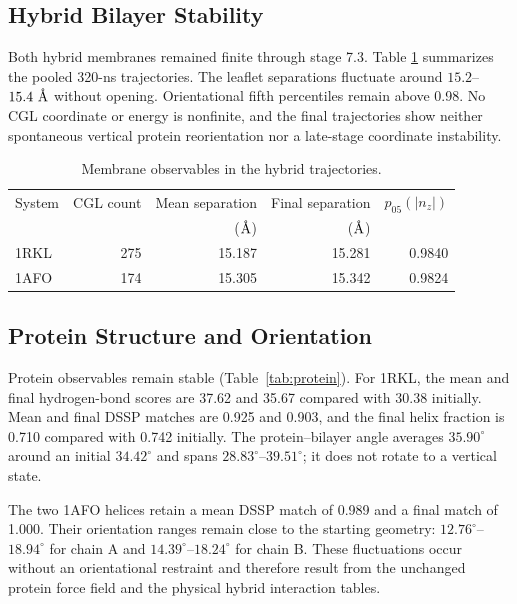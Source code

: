 \documentclass{article}
\newcommand{\angstrom}{\text{\normalfont\AA}}
\begin{document}
\subsection{Hybrid Bilayer Stability}

Both hybrid membranes remained finite through stage 7.3.  Table
\ref{tab:hybrid_membrane} summarizes the pooled 320-ns trajectories.  The
leaflet separations fluctuate around $15.2$--$15.4~\angstrom$ without opening.
Orientational fifth percentiles remain above 0.98.  No CGL coordinate or energy
is nonfinite, and the final trajectories show neither spontaneous vertical
protein reorientation nor a late-stage coordinate instability.

\begin{table}[ht]
\centering
\caption{Membrane observables in the hybrid trajectories.}
\begin{tabular}{lrrrr}
\toprule
System & CGL count & Mean separation & Final separation & $p_{05}(|n_z|)$ \\
 & & ($\angstrom$) & ($\angstrom$) & \\
\midrule
1RKL & 275 & 15.187 & 15.281 & 0.9840 \\
1AFO & 174 & 15.305 & 15.342 & 0.9824 \\
\bottomrule
\end{tabular}
\label{tab:hybrid_membrane}
\end{table}

\subsection{Protein Structure and Orientation}

Protein observables remain stable
(Table~\ref{tab:protein}).  For 1RKL, the mean and final hydrogen-bond scores
are 37.62 and 35.67 compared with 30.38 initially.  Mean and final DSSP matches
are 0.925 and 0.903, and the final helix fraction is 0.710 compared with 0.742
initially.  The protein--bilayer angle averages $35.90^\circ$ around an initial
$34.42^\circ$ and spans $28.83^\circ$--$39.51^\circ$; it does not rotate to a
vertical state.

The two 1AFO helices retain a mean DSSP match of 0.989 and a final match of
1.000.  Their orientation ranges remain close to the starting geometry:
$12.76^\circ$--$18.94^\circ$ for chain A and
$14.39^\circ$--$18.24^\circ$ for chain B.  These fluctuations occur without an
orientational restraint and therefore result from the unchanged protein force
field and the physical hybrid interaction tables.
\end{document}
